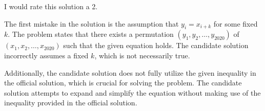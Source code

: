 I would rate this solution a 2.

The first mistake in the solution is the assumption that $y_i = x_{i+k}$ for some fixed $k$. The problem states that there exists a permutation $(y_1, y_2, \dots, y_{2020})$ of $(x_1, x_2, \dots, x_{2020})$ such that the given equation holds. The candidate solution incorrectly assumes a fixed $k$, which is not necessarily true.

Additionally, the candidate solution does not fully utilize the given inequality in the official solution, which is crucial for solving the problem. The candidate solution attempts to expand and simplify the equation without making use of the inequality provided in the official solution.
